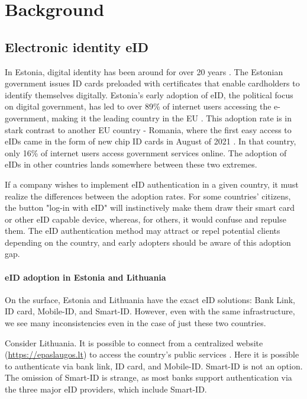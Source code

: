 \section{Background}

\subsection{Electronic identity eID}

In Estonia, digital identity has been around for over 20 years \cite{eelaw-idcard}. The Estonian government issues ID cards preloaded with certificates that enable cardholders to identify themselves digitally. Estonia's early adoption of eID, the political focus on digital government, has led to over 89\% of internet users accessing the e-government, making it the leading country in the EU \cite{eu-desi}. This adoption rate is in stark contrast to another EU country - Romania, where the first easy access to eIDs came in the form of new chip ID cards in August of 2021 \cite{romania-adopts-eid}. In that country, only 16\% of internet users access government services online. The adoption of eIDs in other countries lands somewhere between these two extremes.

If a company wishes to implement eID authentication in a given country, it must realize the differences between the adoption rates. For some countries' citizens, the button "log-in with eID" will instinctively make them draw their smart card or other eID capable device, whereas, for others, it would confuse and repulse them. The eID authentication method may attract or repel potential clients depending on the country, and early adopters should be aware of this adoption gap.

\paragraph{eID adoption in Estonia and Lithuania}

On the surface, Estonia and Lithuania have the exact eID solutions: Bank Link, ID card, Mobile-ID, and Smart-ID. However, even with the same infrastructure, we see many inconsistencies even in the case of just these two countries.

Consider Lithuania. It is possible to connect from a centralized website (\url{https://epaslaugos.lt}) to access the country's public services \cite{eidasnode-lt}. Here it is possible to authenticate via bank link, ID card, and Mobile-ID. Smart-ID is not an option. The omission of Smart-ID is strange, as most banks support authentication via the three major eID providers, which include Smart-ID.

